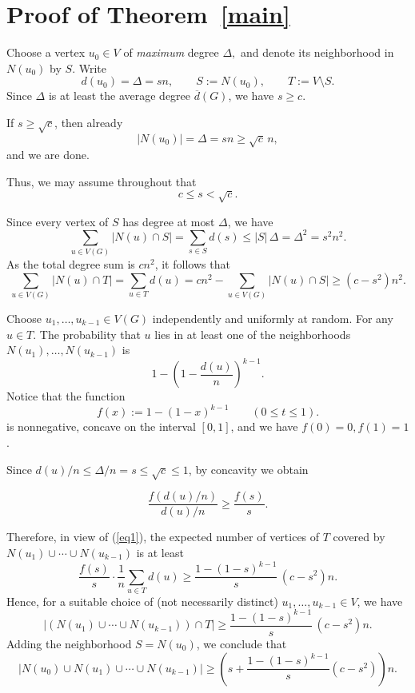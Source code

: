 \documentclass[12pt]{article}
\theoremstyle{plain}
\theoremstyle{definition}
\theoremstyle{remark}
\begin{document}
\section{Proof of Theorem~\ref{main}}

Choose a vertex $u_0\in V$ of \emph{maximum} degree $\Delta,$ and denote its neighborhood in $N(u_0)$ by $S$. Write
\[
d(u_0)=\Delta=sn,\qquad S:=N(u_0),\qquad T:=V\setminus S.
\]
Since $\Delta$ is at least the average degree $\overline{d}(G)$, we have $s\ge c$.

If $s\ge \sqrt c$, then already
\[
|N(u_0)|=\Delta=sn\ge \sqrt c\,n,
\]
and we are done.

Thus, we may assume throughout that
\[
c\le s<\sqrt c.
\]


Since every vertex of $S$ has degree at most $\Delta$, we have
\[
\sum_{u\in V(G)} |N(u)\cap S|
=\sum_{s\in S} d(s)
\le |S|\,\Delta
=\Delta^2
=s^2n^2.
\]
As the total degree sum is $cn^2$, it follows that
\begin{equation}\label{eq1}
\sum_{u\in V(G)} |N(u)\cap T|
=\sum_{u\in T} d(u)
=cn^2-\sum_{u\in V(G)} |N(u)\cap S|
\ge (c-s^2)n^2.
\end{equation}
\medskip

Choose $u_1,\dots,u_{k-1}\in V(G)$ independently and uniformly at random.
For any $u\in T$. The probability that $u$ lies in at least one of the neighborhoods
$N(u_1),\dots,N(u_{k-1})$ is
\[
1-\left(1-\frac{d(u)}{n}\right)^{k-1}.
\]
Notice that the function
\begin{equation}\label{eq2}
f(x):=1-(1-x)^{k-1}\qquad (0\le t\le 1).
\end{equation}
is nonnegative, concave on the interval $[0,1]$, and we have $f(0)=0, f(1)=1$.

Since $d(u)/n\le \Delta/n=s\le\sqrt{c}\le 1$, by concavity we obtain

\[
\frac{f\!\left(d(u)/n\right)}{d(u)/n}
\ge\frac{f(s)}{s}.
\]

Therefore, in view of (\ref{eq1}), the expected number of vertices of $T$ covered by
$N(u_1)\cup\cdots\cup N(u_{k-1})$ is at least
\[
\frac{f(s)}{s}\cdot \frac{1}{n}\sum_{u\in T} d(u)
\ge \frac{1-(1-s)^{k-1}}{s}\,(c-s^2)n.
\]
Hence, for a suitable choice of (not necessarily distinct) $u_1,\dots,u_{k-1}\in V$, we have
\[
\bigl|(N(u_1)\cup\cdots\cup N(u_{k-1}))\cap T\bigr|
\ge
\frac{1-(1-s)^{k-1}}{s}\,(c-s^2)n.
\]
Adding the neighborhood $S=N(u_0)$, we conclude that
\[
\bigl|N(u_0)\cup N(u_1)\cup\cdots\cup N(u_{k-1})\bigr|
\ge \left(s+\frac{1-(1-s)^{k-1}}{s}(c-s^2)\right)n.
\]
\medskip
\end{document}

